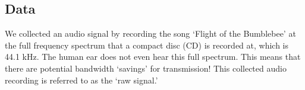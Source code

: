 \subsection{Data}

We collected an audio signal by recording the song
`Flight of the Bumblebee' at the full frequency spectrum that a compact disc (CD) is recorded at, which is 44.1 kHz. The human ear does not even hear this full spectrum.  This means that there are potential bandwidth `savings'
for transmission! This collected audio recording is referred to
as the `raw signal.'
